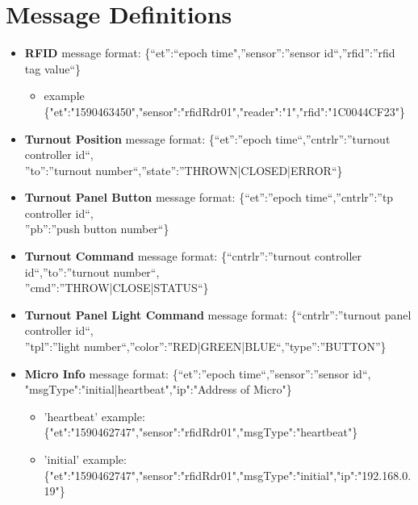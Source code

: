 \section{Message Definitions}
\begin{itemize}
\item \textbf {\ac{RFID}} message format: \{“et”:“epoch time",”sensor”:”sensor id“,”rfid”:”rfid tag value“\}
\begin{itemize}
\item example \{"et":"1590463450","sensor":"rfidRdr01","reader":"1","rfid":"1C0044CF23"\}
\end{itemize}
\item \textbf {Turnout Position} message format: \{“et”:”epoch time“,”cntrlr”:”turnout controller id“, \\”to”:”turnout number“,”state”:”THROWN|CLOSED|ERROR“\}
\item \textbf {Turnout Panel Button} message format: \{“et”:”epoch time“,”cntrlr”:”tp controller id“, \\”pb”:”push button number“\} 
\item \textbf {Turnout Command} message format: \{“cntrlr”:”turnout controller id“,”to”:”turnout number“, \\”cmd”:”THROW|CLOSE|STATUS“\}
\item \textbf {Turnout Panel Light Command} message format: \{“cntrlr”:”turnout panel controller id“, \\”tpl”:”light number“,”color”:”RED|GREEN|BLUE“,”type”:”BUTTON”\}
\item \textbf {Micro Info} message format: \{“et”:”epoch time“,”sensor”:”sensor id“, \\"msgType":"initial|heartbeat","ip":"Address of Micro"\}
\begin{itemize}
\item 'heartbeat' example: \{"et":"1590462747","sensor":"rfidRdr01","msgType":"heartbeat"\} 
\item 'initial' example: \{"et":"1590462747","sensor":"rfidRdr01","msgType":"initial","ip":"192.168.0.19"\}
\end{itemize}
\end{itemize}
